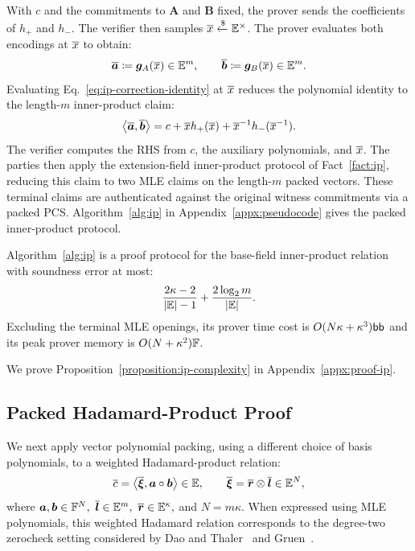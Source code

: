 With \(c\) and the commitments to \(\bm A\) and \(\bm B\)
fixed, the prover sends the coefficients of \(h_+\) and \(h_-\).
The verifier then samples
\(\overline{x}\mathrel{\xleftarrow{\$}}\mathbb{E}^\times\).
The prover evaluates both encodings at \(\overline{x}\) to obtain:
\[
    \overline{\bm a}
    \coloneqq
    \bm g_A(\overline{x}) \in \mathbb{E}^m,
    \qquad
    \overline{\bm b}
    \coloneqq
    \bm g_B(\overline{x})
    \in\mathbb{E}^m.
\]
Evaluating Eq.~\eqref{eq:ip-correction-identity} at \(\overline{x}\)
reduces the polynomial identity to the length-\(m\)
inner-product claim:
\begin{equation}
    \left\langle
        \overline{\bm a},\overline{\bm b}
    \right\rangle
    =
    c
    +\overline{x}h_+(\overline{x})
    +\overline{x}^{-1}h_-(\overline{x}^{-1}).
\label{eq:packed-inner-product-check}
\end{equation}
The verifier computes the RHS from \(c\),
the auxiliary polynomials, and \(\overline{x}\).
The parties then apply the extension-field inner-product
protocol of Fact~\ref{fact:ip}, reducing this claim to two
MLE claims on the length-\(m\) packed vectors.
These terminal claims are authenticated against the
original witness commitments via a packed PCS.
Algorithm~\ref{alg:ip} in Appendix~\ref{appx:pseudocode}
gives the packed inner-product protocol.

\begin{proposition}
\label{proposition:ip-complexity}
Algorithm~\ref{alg:ip} is a proof protocol for the base-field inner-product relation
with soundness error at most:
\[
    \frac{2\kappa-2}{|\mathbb{E}|-1}
    +
    \frac{2\log_2 m}{|\mathbb{E}|}.
\]
Excluding the terminal MLE openings, its prover time cost is
\(
    O(N \kappa + \kappa^3)\mathsf{bb}
\)
and its peak prover memory is \(O(N+\kappa^2) {\mathbb{F}}\).
\end{proposition}

We prove Proposition~\ref{proposition:ip-complexity}
in Appendix~\ref{appx:proof-ip}.


\subsection{Packed Hadamard-Product Proof}
\label{sec:hadamard}

We next apply vector polynomial packing, using a different choice of
basis polynomials, to a weighted
Hadamard-product relation:
\begin{equation}
    \overline{c}
    =
    \left\langle
        \overline{\bm\xi},
        \bm a\circ\bm b
    \right\rangle \in \mathbb{E},
    \qquad
    \overline{\bm\xi}
    =
    \overline{\bm r}\mathbin{\otimes}\overline{\bm l} \in \mathbb{E}^N,
\label{eq:hadamard-claim}
\end{equation}
where
\(
    \bm a,\bm b\in{\mathbb{F}}^N,~
    \overline{\bm l}\in\mathbb{E}^m,~
    \overline{\bm r}\in\mathbb{E}^\kappa,
\)
and
\(
    N=m\kappa.
\)
When expressed using MLE polynomials, this weighted
Hadamard relation corresponds to the degree-two
zerocheck setting considered by Dao and Thaler~\cite{iacr/DaoT24}
and Gruen~\cite{iacr/Gruen24}.

